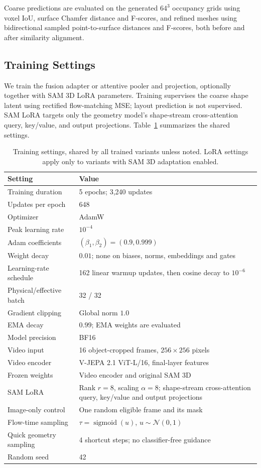 \documentclass{article}
\begin{document}
Coarse predictions are evaluated on the generated $64^3$ occupancy grids using voxel IoU, surface Chamfer distance and F-scores, and refined meshes using bidirectional sampled point-to-surface distances and F-scores, both before and after similarity alignment.

\subsection{Training Settings}

We train the fusion adapter or attentive pooler and projection, optionally together with SAM 3D LoRA parameters. Training supervises the coarse shape latent using rectified flow-matching MSE; layout prediction is not supervised. SAM LoRA targets only the geometry model's shape-stream cross-attention query, key/value, and output projections. Table~\ref{tab:training-settings} summarizes the shared settings.

\begin{table}[t]
\centering
\small
\caption{Training settings, shared by all trained variants unless noted. LoRA settings apply only to variants with SAM 3D adaptation enabled.}
\label{tab:training-settings}
\begin{tabular}{@{}p{}p{}@{}}
\toprule
Setting & Value \\
\midrule
Training duration & 5 epochs; 3,240 updates \\
Updates per epoch & 648 \\
Optimizer & AdamW \\
Peak learning rate & $10^{-4}$ \\
Adam coefficients & $(\beta_1,\beta_2)=(0.9,0.999)$ \\
Weight decay & $0.01$; none on biases, norms, embeddings and gates \\
Learning-rate schedule & 162 linear warmup updates, then cosine decay to $10^{-6}$ \\
Physical/effective batch & 32 / 32 \\
Gradient clipping & Global norm $1.0$ \\
EMA decay & $0.99$; EMA weights are evaluated \\
Model precision & BF16 \\
Video input & 16 object-cropped frames, $256\times256$ pixels \\
Video encoder & V-JEPA 2.1 ViT-L/16, final-layer features \\
Frozen weights & Video encoder and original SAM 3D \\
SAM LoRA & Rank $r=8$, scaling $\alpha=8$; shape-stream cross-attention query, key/value and output projections \\
Image-only control & One random eligible frame and its mask \\
Flow-time sampling & $\tau=\operatorname{sigmoid}(u)$, $u\sim\mathcal{N}(0,1)$ \\
Quick geometry sampling & 4 shortcut steps; no classifier-free guidance \\
Random seed & 42 \\
\bottomrule
\end{tabular}
\end{table}
\end{document}

